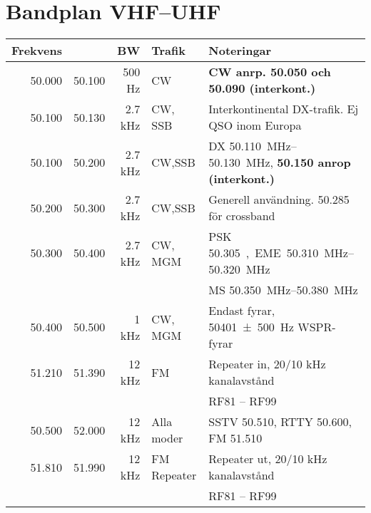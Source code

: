\section{Bandplan VHF--UHF}

\begin{tabular}{rrrll}
	
\textbf{Frekvens} &  & \textbf{BW} & \textbf{Trafik} & \textbf{Noteringar} \\ \hline
	
50.000 & 50.100 & 500 Hz  & CW          & \textbf{CW anrp. 50.050 och 50.090 (interkont.)}             \\ \hline
50.100 & 50.130 & 2.7 kHz & CW, SSB     & Interkontinental DX-trafik. Ej QSO inom Europa               \\ \hline
50.100 & 50.200 & 2.7 kHz & CW,SSB      & DX \SIrange{50,110}{50,130}{MHz}, \textbf{\SI{50,150}{} anrop (interkont.)} \\ \hline
50.200 & 50.300 & 2.7 kHz & CW,SSB      & Generell användning. \SI{50,285}{} för crossband                    \\ \hline
50.300 & 50.400 & 2.7 kHz & CW, MGM     & PSK \SI{50,305}, EME \SIrange{50,310}{50,320}{MHz}                              \\
       &        &         &             & MS \SIrange{50,350}{50,380}{MHz}                                           \\ \hline
50.400 & 50.500 & 1 kHz   & CW, MGM     & Endast fyrar, \SI{50401(500)}{Hz} WSPR-fyrar                  \\ \hline
51.210 & 51.390 & 12 kHz  & FM          & Repeater in, 20/10 kHz kanalavstånd                 \\
       &        &         &             & RF81 – RF99                                                  \\ \hline
50.500 & 52.000 & 12 kHz  & Alla moder  & SSTV \SI{50,510}{}, RTTY \SI{50,600}{}, FM \SI{51,510}{}     \\ \hline
51.810 & 51.990 & 12 kHz  & FM Repeater & Repeater ut, 20/10 kHz kanalavstånd                          \\
       &        &         &             & RF81 – RF99                                                  \\ \hline
\end{tabular}

